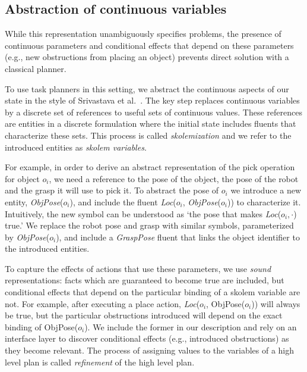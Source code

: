 \subsection{Abstraction of continuous variables}
While this representation unambiguously specifies problems, the
presence of continuous parameters and conditional effects that depend
on these parameters (e.g., new obstructions from placing an object)
prevents direct solution with a classical planner. 

To use task planners in this setting, we abstract the continuous
aspects of our state in the style of Srivastava et
al.~\cite{srivastava2014combined}. The key step replaces continuous
variables by a discrete set of references to useful sets of continuous
values. These references are entities in a discrete formulation where
the initial state includes fluents that characterize these sets. This
process is called \emph{skolemization} and we refer to the introduced
entities as \emph{skolem variables}.

For example, in order to derive an abstract representation of the pick
operation for object $o_i$, we need a reference to the pose of the
object, the pose of the robot and the grasp it will use to pick it. To
abstract the pose of $o_i$ we introduce a new entity,
\emph{ObjPose}($o_i$), and include the fluent \emph{Loc}($o_i$,
\emph{ObjPose}($o_i$)) to characterize it. Intuitively, the new symbol
can be understood as `the pose that makes \emph{Loc}($o_i, \cdot$)
true.' We replace the robot pose and grasp with similar symbols,
parameterized by \emph{ObjPose}($o_i$), and include a \emph{GraspPose}
fluent that links the object identifier to the introduced
entities.

To capture the effects of actions that use these parameters, we use
\emph{sound} representations: facts which are guaranteed to become
true are included, but conditional effects that depend on the
particular binding of a skolem variable are not. For example, after
executing a place action, \emph{Loc}($o_i$, ObjPose($o_i$)) will always
be true, but the particular obstructions introduced will depend on the
exact binding of ObjPose($o_i$). We include the former in our
description and rely on an interface layer to discover conditional
effects (e.g., introduced obstructions) as they become relevant. The
process of assigning values to the variables of a high level plan is
called \emph{refinement} of the high level plan.

